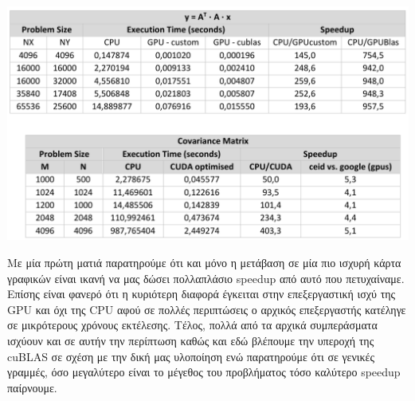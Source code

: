 \begin{center}
    \includegraphics[scale=0.9]{./figures/3_covar/google}
\end{center}

\noindent Με μία πρώτη ματιά παρατηρούμε ότι και μόνο η μετάβαση σε μία πιο ισχυρή κάρτα γραφικών είναι ικανή να μας δώσει πολλαπλάσιο speedup από αυτό που πετυχαίναμε. Επίσης είναι φανερό ότι η κυριότερη διαφορά έγκειται στην επεξεργαστική ισχύ της GPU και όχι της CPU αφού σε πολλές περιπτώσεις ο αρχικός επεξεργαστής κατέληγε σε μικρότερους χρόνους εκτέλεσης. Τέλος, πολλά από τα αρχικά συμπεράσματα ισχύουν και σε αυτήν την περίπτωση καθώς και εδώ βλέπουμε την υπεροχή της cuBLAS σε σχέση με την δική μας υλοποίηση ενώ παρατηρούμε ότι σε γενικές γραμμές, όσο μεγαλύτερο είναι το μέγεθος του προβλήματος τόσο καλύτερο speedup παίρνουμε. 